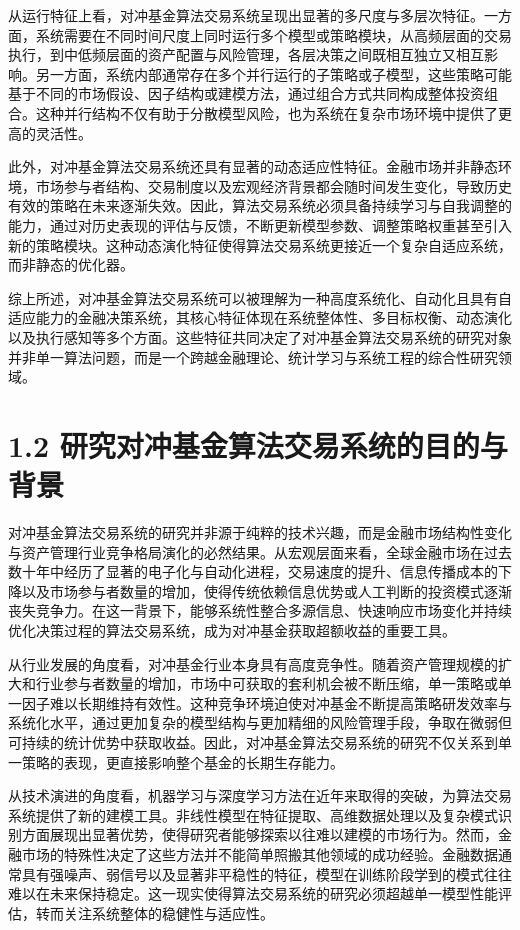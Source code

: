 \documentclass[UTF8]{ctexart}
\begin{document}
从运行特征上看，对冲基金算法交易系统呈现出显著的多尺度与多层次特征。一方面，系统需要在不同时间尺度上同时运行多个模型或策略模块，从高频层面的交易执行，到中低频层面的资产配置与风险管理，各层决策之间既相互独立又相互影响。另一方面，系统内部通常存在多个并行运行的子策略或子模型，这些策略可能基于不同的市场假设、因子结构或建模方法，通过组合方式共同构成整体投资组合。这种并行结构不仅有助于分散模型风险，也为系统在复杂市场环境中提供了更高的灵活性。

此外，对冲基金算法交易系统还具有显著的动态适应性特征。金融市场并非静态环境，市场参与者结构、交易制度以及宏观经济背景都会随时间发生变化，导致历史有效的策略在未来逐渐失效。因此，算法交易系统必须具备持续学习与自我调整的能力，通过对历史表现的评估与反馈，不断更新模型参数、调整策略权重甚至引入新的策略模块。这种动态演化特征使得算法交易系统更接近一个复杂自适应系统，而非静态的优化器。

综上所述，对冲基金算法交易系统可以被理解为一种高度系统化、自动化且具有自适应能力的金融决策系统，其核心特征体现在系统整体性、多目标权衡、动态演化以及执行感知等多个方面。这些特征共同决定了对冲基金算法交易系统的研究对象并非单一算法问题，而是一个跨越金融理论、统计学习与系统工程的综合性研究领域。

\section{1.2
研究对冲基金算法交易系统的目的与背景}\label{ux7814ux7a76ux5bf9ux51b2ux57faux91d1ux7b97ux6cd5ux4ea4ux6613ux7cfbux7edfux7684ux76eeux7684ux4e0eux80ccux666f}

对冲基金算法交易系统的研究并非源于纯粹的技术兴趣，而是金融市场结构性变化与资产管理行业竞争格局演化的必然结果。从宏观层面来看，全球金融市场在过去数十年中经历了显著的电子化与自动化进程，交易速度的提升、信息传播成本的下降以及市场参与者数量的增加，使得传统依赖信息优势或人工判断的投资模式逐渐丧失竞争力。在这一背景下，能够系统性整合多源信息、快速响应市场变化并持续优化决策过程的算法交易系统，成为对冲基金获取超额收益的重要工具。

从行业发展的角度看，对冲基金行业本身具有高度竞争性。随着资产管理规模的扩大和行业参与者数量的增加，市场中可获取的套利机会被不断压缩，单一策略或单一因子难以长期维持有效性。这种竞争环境迫使对冲基金不断提高策略研发效率与系统化水平，通过更加复杂的模型结构与更加精细的风险管理手段，争取在微弱但可持续的统计优势中获取收益。因此，对冲基金算法交易系统的研究不仅关系到单一策略的表现，更直接影响整个基金的长期生存能力。

从技术演进的角度看，机器学习与深度学习方法在近年来取得的突破，为算法交易系统提供了新的建模工具。非线性模型在特征提取、高维数据处理以及复杂模式识别方面展现出显著优势，使得研究者能够探索以往难以建模的市场行为。然而，金融市场的特殊性决定了这些方法并不能简单照搬其他领域的成功经验。金融数据通常具有强噪声、弱信号以及显著非平稳性的特征，模型在训练阶段学到的模式往往难以在未来保持稳定。这一现实使得算法交易系统的研究必须超越单一模型性能评估，转而关注系统整体的稳健性与适应性。
\end{document}
